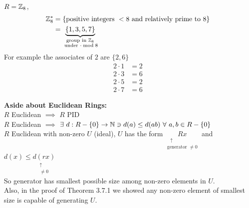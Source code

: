 \begin{example}
    $R={\mathbb{Z}}_8$,
    \begin{align*}
        {\mathbb{Z}}_8^* &= \{\text{positive integers }<8 \text{ and relatively prime to }8\} \\
        &=\underbrace{\{1,3,5,7\}}_{\substack{ \text{group in }{\mathbb{Z}}_8 \\ \text{ under }\cdot \bmod 8}}
    \end{align*}
    For example the associates of $2$ are $\{2,6\}$
    \begin{align*}
        2\cdot 1 &= 2 \\
        2\cdot 3 &= 6 \\
        2\cdot 5 &= 2 \\
        2\cdot 7 &= 6
    \end{align*}
\end{example}
\begin{tcolorbox}
    \textbf{Aside about Euclidean Rings:} \\ \steezybreak
    $R$ Euclidean $\implies$ $R$ PID \\
    $R$ Euclidean $\implies$
    $\exists \ d: R-\{0\}\rightarrow {\mathbb{N}} \ni d(a)\leq d(ab) \ \forall \ a,b\in R-\{0\}$ \\
    $R$ Euclidean with non-zero $U$ (ideal), $U$ has the form
    $\underset{\substack{\ \ \  \uparrow \\ \text{generator }\neq 0}}{Rx}$ and
    $d(x)\leq \underset{\substack{\uparrow \\ \neq 0}}{d(rx)}$\\
    So generator has smallest possible size among non-zero elements in $U$. \\
    Also, in the proof of Theorem 3.7.1 we showed any non-zero element of smallest size is capable
    of generating $U$.
\end{tcolorbox}

